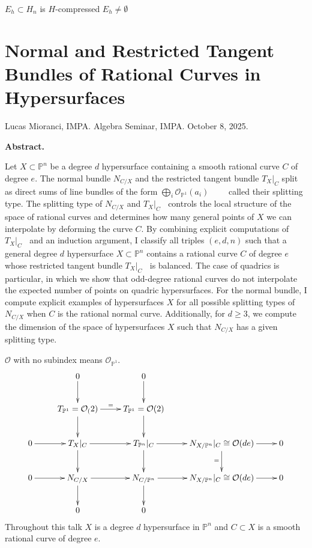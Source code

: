 {\begin{theorem}
\label{theorem-E}
$E_h \subset H_n$ is $H$-compressed 
$E_h \neq  \emptyset$
\end{theorem}

\section{Normal and Restricted Tangent Bundles of Rational
Curves in Hypersurfaces}
\label{section-restricted-tangent-bundles}

\noindent
Lucas Mioranci, IMPA.
Algebra Seminar, IMPA. 
October 8, 2025.

\medskip
{\bf Abstract.} 

Let $X\subset \mathbb{P}^n$ be a degree $d$ hypersurface containing a smooth
rational curve $C$ of degree $e$. The normal bundle $N_{C/X}$ and the restricted
tangent bundle $T_X|_C$ split as direct sums of line bundles of the form
$\bigoplus_i \mathcal{O}_{\mathbb{P}^1}(a_i)\qquad$ called their splitting type.
The splitting type of $N_{C/X}$ and ${T_X}|_C\;\;$ controls the local structure
of the space of rational curves and determines how many general points of $X$ we
can interpolate by deforming the curve $C$. By combining explicit computations
of $T_X|_C\;\;$ and an induction argument, I classify all triples $(e,d,n)$ such
that a general degree $d$ hypersurface $X\subset \mathbb{P}^n$ contains a
rational curve $C$ of degree $e$ whose restricted tangent bundle ${T_X}|_C\;\;$
is balanced. The case of quadrics is particular, in which we show that
odd-degree rational curves do not interpolate the expected number of points on
quadric hypersurfaces.  For the normal bundle, I compute explicit examples of
hypersurfaces $X$ for all possible splitting types of $N_{C/X}$ when $C$ is the
rational normal curve. Additionally, for $d\ge 3$, we compute the dimension of
the space of hypersurfaces $X$ such that $N_{C/X}$ has a given splitting type.



\medskip\noindent

$\mathcal{O}$ with no subindex means $\mathcal{O}_{\mathbb{P}^1}$.
$$
\xymatrix{
&0\ar[d]&0\ar[d]\\
&T_{\mathbb{P}^1}=\mathcal{O}_(2)\ar[d]\ar[r]^=
&T_{\mathbb{P}^1}=\mathcal{O}(2)\ar[d]\\
0\ar[r]&T_{X}|_{C}\ar[d]\ar[r]&T_{\mathbb{P}^n}|_{C}\ar[d]\ar[r]&
N_{X/\mathbb{P}^n}|_{C}\cong \mathcal{O}(de)\ar[d]_=\ar[r]&0\\
0\ar[r]& N_{C/X}\ar[d]\ar[r]&N_{C/\mathbb{P}^n}\ar[d]\ar[r]&
N_{X/\mathbb{P}^n}|_{C}\cong \mathcal{O}(de)\ar[r]&0\\
&0&0
}
$$
Throughout this talk
$X$ is a degree $d$ hypersurface in $\mathbb{P}^n$ 
and $C \subset X$ is a smooth rational curve of degree $e$.

}
